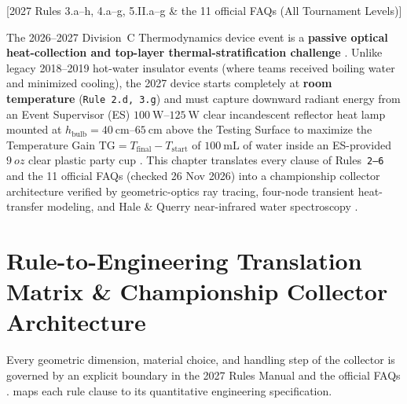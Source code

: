 [2027 Rules 3.a--h, 4.a--g, 5.II.a--g \& the 11 official FAQs (All Tournament Levels)]

The 2026--2027 Division~C Thermodynamics device event is a \textbf{passive optical heat-collection and top-layer thermal-stratification challenge} . Unlike legacy 2018--2019 hot-water insulator events (where teams received boiling water and minimized cooling), the 2027 device starts completely at \textbf{room temperature} (\texttt{Rule 2.d, 3.g}) and must capture downward radiant energy from an Event Supervisor (ES) $\SIrange{100}{125}{\watt}$ clear incandescent reflector heat lamp mounted at $h_{\mathrm{bulb}} = \SIrange{40}{65}{\centi\meter}$ above the Testing Surface to maximize the Temperature Gain $\mathrm{TG} = T_{\mathrm{final}} - T_{\mathrm{start}}$ of $\SI{100}{\milli\liter}$ of water inside an ES-provided $\SI{9}{oz}$ clear plastic party cup . This chapter translates every clause of Rules~\texttt{2--6} and the 11 official FAQs (checked 26 Nov 2026) into a championship collector architecture verified by geometric-optics ray tracing, four-node transient heat-transfer modeling, and Hale \& Querry near-infrared water spectroscopy .

\section{Rule-to-Engineering Translation Matrix \& Championship Collector Architecture}\label{sec:15.1}

Every geometric dimension, material choice, and handling step of the collector is governed by an explicit boundary in the 2027 Rules Manual and the official FAQs .  maps each rule clause to its quantitative engineering specification.

